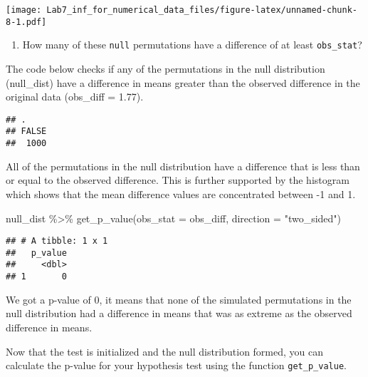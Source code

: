 \documentclass[
]{article}
\newenvironment{Shaded}{\begin{snugshade}}{\end{snugshade}}
\newcommand{\AttributeTok}[1]{\textcolor[rgb]{0.77,0.63,0.00}{#1}}
\newcommand{\DecValTok}[1]{\textcolor[rgb]{0.00,0.00,0.81}{#1}}
\newcommand{\FunctionTok}[1]{\textcolor[rgb]{0.00,0.00,0.00}{#1}}
\newcommand{\NormalTok}[1]{#1}
\newcommand{\SpecialCharTok}[1]{\textcolor[rgb]{0.00,0.00,0.00}{#1}}
\newcommand{\StringTok}[1]{\textcolor[rgb]{0.31,0.60,0.02}{#1}}
\providecommand{\tightlist}{%
  \setlength{\itemsep}{0pt}\setlength{\parskip}{0pt}}
\begin{document}
\texttt{[image: Lab7\_inf\_for\_numerical\_data\_files/figure-latex/unnamed-chunk-8-1.pdf]}

\begin{enumerate}
\def\labelenumi{\arabic{enumi}.}
\setcounter{enumi}{5}
\tightlist
\item
  How many of these \texttt{null} permutations have a difference of at
  least \texttt{obs\_stat}?
\end{enumerate}

The code below checks if any of the permutations in the null
distribution (null\_dist) have a difference in means greater than the
observed difference in the original data (obs\_diff = 1.77).

\begin{Shaded}
\end{Shaded}

\begin{verbatim}
## .
## FALSE 
##  1000
\end{verbatim}

All of the permutations in the null distribution have a difference that
is less than or equal to the observed difference. This is further
supported by the histogram which shows that the mean difference values
are concentrated between -1 and 1.

\begin{Shaded}
\begin{Highlighting}[]
\NormalTok{null\_dist }\SpecialCharTok{\%\textgreater{}\%}
  \FunctionTok{get\_p\_value}\NormalTok{(}\AttributeTok{obs\_stat =}\NormalTok{ obs\_diff, }\AttributeTok{direction =} \StringTok{"two\_sided"}\NormalTok{)}
\end{Highlighting}
\end{Shaded}

\begin{verbatim}
## # A tibble: 1 x 1
##   p_value
##     <dbl>
## 1       0
\end{verbatim}

We got a p-value of 0, it means that none of the simulated permutations
in the null distribution had a difference in means that was as extreme
as the observed difference in means.

Now that the test is initialized and the null distribution formed, you
can calculate the p-value for your hypothesis test using the function
\texttt{get\_p\_value}.
\end{document}
